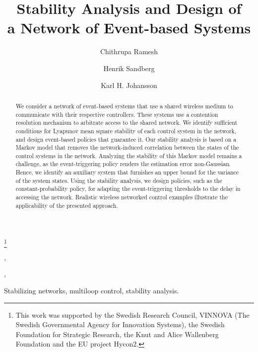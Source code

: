 \documentclass[twocolumn]{autart}
\begin{document}
\begin{frontmatter}
\title{Stability Analysis and Design of \\
a Network of Event-based Systems}
\thanks[footnoteinfo]{This work was supported by the Swedish Research Council, VINNOVA (The Swedish Governmental Agency for Innovation Systems), the Swedish Foundation for Strategic Research, the Knut and Alice Wallenberg Foundation and the EU project Hycon$2$.}
\author{Chithrupa Ramesh},    \author{Henrik Sandberg},  \author{Karl H. Johansson}
\address{ACCESS Linnaeus Centre, KTH Royal Institute of Technology, Electrical Engineering, Stockholm, Sweden}


\begin{keyword}                           Stabilizing networks, multiloop control, stability analysis.              \end{keyword}                             

\begin{abstract}
We consider a network of event-based systems that use a shared wireless medium to communicate with their respective controllers. These systems use a contention resolution mechanism to arbitrate access to the shared network. We identify sufficient conditions for Lyapunov mean square stability of each control system in the network, and design event-based policies that guarantee it. Our stability analysis is based on a Markov model that removes the network-induced correlation between the states of the control systems in the network. Analyzing the stability of this Markov model remains a challenge, as the event-triggering policy renders the estimation error non-Gaussian. Hence, we identify an auxiliary system that furnishes an upper bound for the variance of the system states. Using the stability analysis, we design policies, such as the constant-probability policy, for adapting the event-triggering thresholds to the delay in accessing the network. Realistic wireless networked control examples illustrate the applicability of the presented approach.
\end{abstract}
\end{frontmatter}
\end{document}
